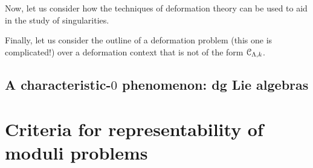             Now, let us consider how the techniques of deformation theory can be used to aid in the study of singularities. 
            \begin{example}
                
            \end{example}

            Finally, let us consider the outline of a deformation problem (this one is complicated!) over a deformation context that is not of the form $\mathcal{C}_{\Lambda, k}$.
            \begin{example}
                
            \end{example}

        \subsection{A characteristic-$0$ phenomenon: dg Lie algebras}
        
    \section{Criteria for representability of moduli problems}
